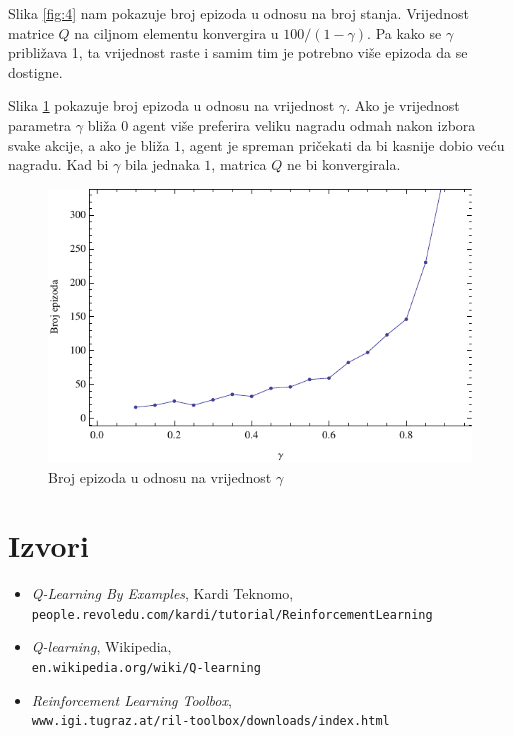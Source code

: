 \documentclass[    DIV=calc, paper=a4,fontsize=11pt, twocolumn]{scrartcl}                     %
\begin{document}
Slika \ref{fig:4} nam pokazuje broj epizoda u odnosu na broj stanja. Vrijednost matrice $Q$ na ciljnom elementu konvergira
u $100/(1-\gamma)$. Pa kako se $\gamma$ približava 1, ta vrijednost raste i samim tim je potrebno više epizoda da se dostigne.

Slika \ref{fig:5} pokazuje broj epizoda u odnosu na vrijednost $\gamma$. Ako je vrijednost parametra $\gamma$ bliža $0$ agent više preferira veliku nagradu odmah nakon izbora svake akcije, a ako je bliža $1$, agent je spreman pričekati da bi kasnije dobio veću nagradu. Kad bi $\gamma$ bila jednaka $1$, matrica $Q$ ne bi konvergirala.

\begin{figure}[h!]
\centering
\includegraphics[scale=0.8]{slike/bench3.pdf}
\caption{Broj epizoda u odnosu na vrijednost $\gamma$}
\label{fig:5}
\end{figure}

\section*{Izvori}
\begin{itemize}
\item \emph{Q-Learning By Examples}, Kardi Teknomo, 
\texttt{\small people.revoledu.com/kardi/tutorial/ReinforcementLearning}
\item \emph{Q-learning}, Wikipedia, \\
\texttt{\small en.wikipedia.org/wiki/Q-learning}
\item \emph{Reinforcement Learning Toolbox},\\ 
\texttt{\small www.igi.tugraz.at/ril-toolbox/downloads/index.html}
\end{itemize}
\end{document}
